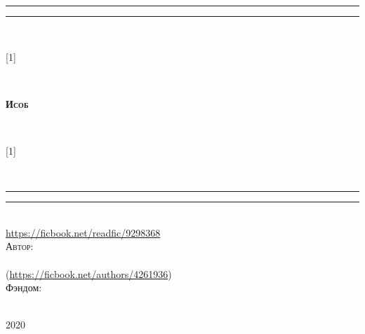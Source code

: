 

\begin{titlepage}
    {\begingroup
{}
\noindent
\endgroup}
\clearpage



\clearpage
	{\begingroup
    \centering %
    \vfill
    \parbox{\textwidth}{%
    \rule{\textwidth}{1.6pt}\vspace*{-\baselineskip}\vspace*{2pt} %
    \rule{\textwidth}{0.4pt}\\[0.2\baselineskip] %
    \parbox{\textwidth}{%
    \parbox[c][2cm][c]{2cm}{\scalebox{-1}[1]{}}
    ~ \hrulefill ~
    \parbox[c][2cm][c]{5cm}{\centering\textsc{\LARGE \textbf{Исоб}}}
     ~\hrulefill ~
    \parbox[c][2cm][c]{2cm}{\scalebox{-1}[1]{}}}\\[0.2\baselineskip] %
    \rule{\textwidth}{0.4pt}\vspace*{-\baselineskip}\vspace{3.2pt} %
    \rule{\textwidth}{1.6pt}}\\[2\baselineskip] %
    
    \href{https://ficbook.net/readfic/9298368}{https://ficbook.net/readfic/9298368} \\[0.5\baselineskip] %
    \vspace*{4\baselineskip} %
    {\scshape %
        Автор: \\[0.5\baselineskip]
        {\Large \authorfname} \\ [0.5\baselineskip]
    }
    (\href{https://ficbook.net/authors/4261936}{https://ficbook.net/authors/4261936}) \\
    
    \vfill \vfill
    {Фэндом: } %
    
   
    \vfill %
     \\[0.3\baselineskip] %
    {\scshape 2020} \\[0.3\baselineskip] %
    
    \endgroup}
    \clearpage
    \centering
    
\end{titlepage}
